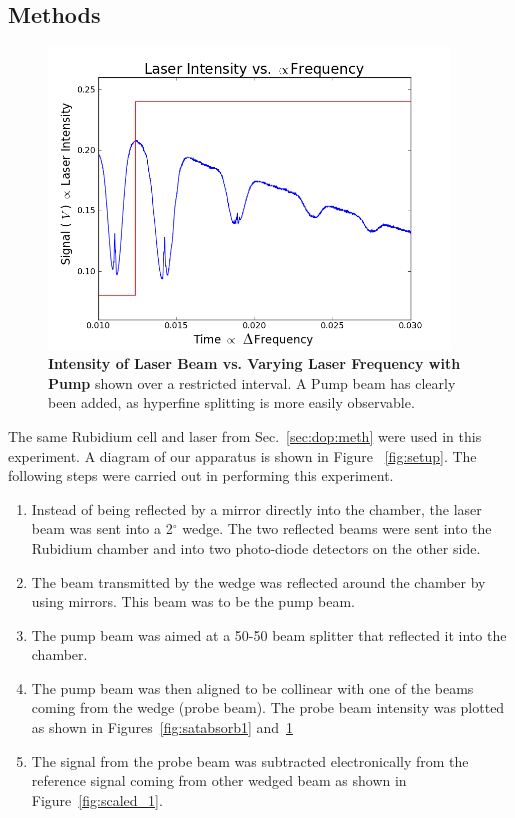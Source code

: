 \documentclass[paper=a4, fontsize=11pt]{scrartcl} %
\numberwithin{equation}{section}
\numberwithin{figure}{section}
\numberwithin{table}{section}
\begin{document}
\subsection{Methods}
\label{sec:satabmeth}
\begin{figure}[h] \begin{center}
  \includegraphics[height=80mm]{2-2-002-zoom.png}
  \caption{\textbf{Intensity of Laser Beam vs. Varying Laser Frequency with Pump} shown over a restricted interval. A Pump beam has clearly been added, as hyperfine splitting is more easily observable. }
  \label{fig:withPump_1}
\end{center} \end{figure}
The same Rubidium cell and laser from Sec.~\ref{sec:dop:meth} were
used in this experiment. A diagram of our apparatus is shown in Figure
~\ref{fig:setup}. The following steps were carried out in performing
this experiment. 
\begin{enumerate}
\item Instead of being reflected by a mirror directly into the
  chamber, the laser beam was sent into a 2$^\circ$ wedge. The two reflected beams were sent
  into the Rubidium chamber and into two photo-diode detectors on the
  other side.
\item The beam transmitted by the wedge was reflected around the chamber by using mirrors. This beam was to be the pump beam.
\item The pump beam was aimed at a 50-50 beam
  splitter that reflected it into the chamber.
\item The pump beam was then aligned to be collinear with one of the
  beams coming from the wedge (probe beam). The probe beam intensity was
  plotted as shown in Figures~\ref{fig:satabsorb1} and~\ref{fig:withPump_1}
\item The signal from the probe beam was subtracted electronically
  from the reference signal coming from other wedged beam as shown in Figure~\ref{fig:scaled_1}. 
\end{enumerate}
\end{document}
